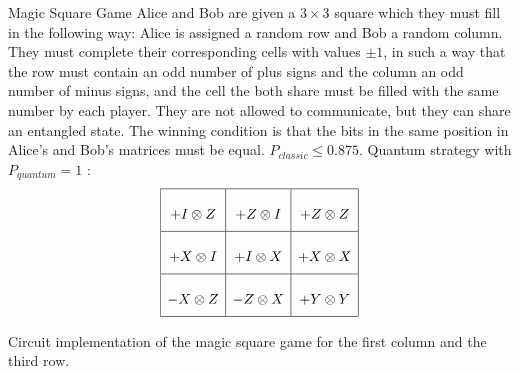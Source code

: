 \documentclass{beamer}
\begin{document}
\begin{frame}{Magic Square Game}
    Alice and Bob are given a $3 \times 3$ square which they must fill in the following way: Alice is assigned a random row and Bob a random column. They must complete their corresponding cells with values $\pm1$, in such a way that the row must contain an odd number of plus signs and the column an odd number of minus signs, and the cell the both share must be filled with the same number by each player. They are not allowed to communicate, but they can share an entangled state. The winning condition is that the bits in the same position in Alice's and Bob's matrices must be equal. $P_{classic} \leq 0.875$. 
    Quantum strategy with $P_{quantum} = 1$ \cite{Laghaout_2022}:
    \[
\renewcommand{\arraystretch}{2.5}
\begin{array}{|c|c|c|}
\hline
+I \otimes Z & +Z \otimes I & +Z \otimes Z \\
\hline
+X \otimes I & +I \otimes X & +X \otimes X \\
\hline
-X \otimes Z & -Z \otimes X & +Y \otimes Y \\
\hline
\end{array}
\]
\end{frame}
\begin{frame}
    \begin{figure}
        \centering
        
    \end{figure}
    Circuit implementation of the magic square game for the first column and the third row.
\end{frame}
\end{document}
